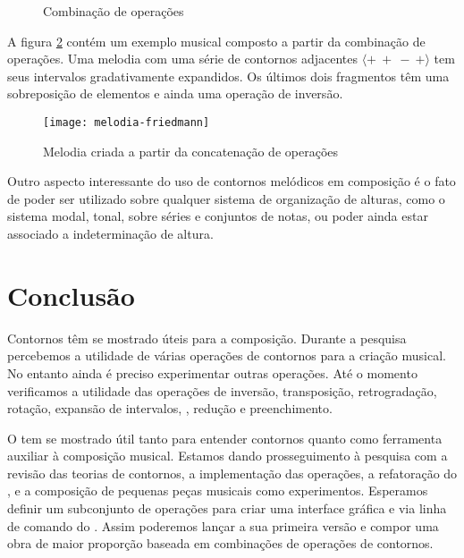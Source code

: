 \begin{figure}
  \centering
  \caption{Combinação de operações}
  \label{fig:combinacao-operacoes}
\end{figure}

A figura \ref{fig:melodia-concatenacao-operacoes} contém um exemplo
musical composto a partir da combinação de operações. Uma melodia com
uma série de contornos adjacentes 
$\langle+\:+\:-\:+\rangle$ tem seus intervalos gradativamente
expandidos. Os últimos dois fragmentos têm uma sobreposição de
elementos e ainda uma operação de inversão.

\begin{figure}
  \centering
  \texttt{[image: melodia-friedmann]}
  \caption{Melodia criada a partir da concatenação de operações}
  \label{fig:melodia-concatenacao-operacoes}
\end{figure}

Outro aspecto interessante do uso de contornos melódicos em composição
é o fato de poder ser utilizado sobre qualquer sistema de organização
de alturas, como o sistema modal, tonal, sobre séries e conjuntos de
notas, ou poder ainda estar associado a indeterminação de altura.

\section{Conclusão}
\label{sec:conclusao}

Contornos têm se mostrado úteis para a composição. Durante a pesquisa
percebemos a utilidade de várias operações de contornos para a criação
musical. No entanto ainda é preciso experimentar outras operações. Até
o momento verificamos a utilidade das operações de inversão,
transposição, retrogradação, rotação, expansão de intervalos,
, redução e preenchimento.

O \goiaba{} tem se mostrado útil tanto para entender contornos quanto
como ferramenta auxiliar à composição musical. Estamos dando
prosseguimento à pesquisa com a revisão das teorias de contornos, a
implementação das operações, a refatoração do \goiaba{}, e a
composição de pequenas peças musicais como experimentos. Esperamos
definir um subconjunto de operações para criar uma interface gráfica e
via linha de comando do \goiaba{}. Assim poderemos lançar a sua
primeira versão e compor uma obra de maior proporção baseada em
combinações de operações de contornos.

